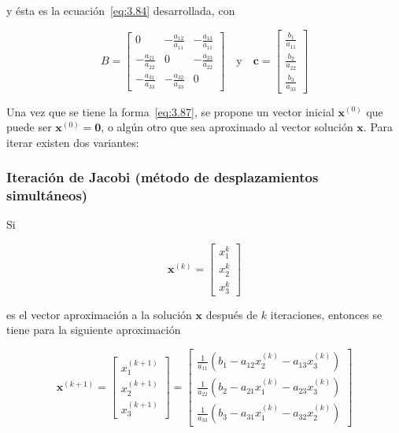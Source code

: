 \documentclass[12pt,letterpaper]{article}
\theoremstyle{definition}
\theoremstyle{plain}
\theoremstyle{remark}
\begin{document}
y ésta es la ecuación~\eqref{eq:3.84} desarrollada, con

\[
B = 
\begin{bmatrix}
0 & -\frac{a_{12}}{a_{11}} & -\frac{a_{13}}{a_{11}} \\
-\frac{a_{21}}{a_{22}} & 0 & -\frac{a_{23}}{a_{22}} \\
-\frac{a_{31}}{a_{33}} & -\frac{a_{32}}{a_{33}} & 0
\end{bmatrix}
\quad \text{y} \quad
\mathbf{c} = 
\begin{bmatrix}
\frac{b_1}{a_{11}} \\
\frac{b_2}{a_{22}} \\
\frac{b_3}{a_{33}}
\end{bmatrix}
\]

Una vez que se tiene la forma~\eqref{eq:3.87}, se propone un vector inicial $\mathbf{x}^{(0)}$ que puede ser $\mathbf{x}^{(0)} = \mathbf{0}$, o algún otro que sea aproximado al vector solución $\mathbf{x}$. Para iterar existen dos variantes:

\subsubsection{Iteración de Jacobi (método de desplazamientos simultáneos)}

Si

\begin{equation}
\mathbf{x}^{(k)} = 
\begin{bmatrix}
x_1^{k} \\
x_2^{k} \\
x_3^{k}
\end{bmatrix}
\label{eq:3.88}
\tag{8}
\end{equation}

es el vector aproximación a la solución $\mathbf{x}$ después de $k$ iteraciones, entonces se tiene para la siguiente aproximación

\begin{equation}
\mathbf{x}^{(k+1)} =
\begin{bmatrix}
x_1^{(k+1)} \\
x_2^{(k+1)} \\
x_3^{(k+1)}
\end{bmatrix}
=
\begin{bmatrix}
\frac{1}{a_{11}} (b_1 - a_{12} x_2^{(k)} - a_{13} x_3^{(k)}) \\
\frac{1}{a_{22}} (b_2 - a_{21} x_1^{(k)} - a_{23} x_3^{(k)}) \\
\frac{1}{a_{33}} (b_3 - a_{31} x_1^{(k)} - a_{32} x_2^{(k)})
\end{bmatrix}
\label{eq:3.89}
\tag{9}
\end{equation}
\end{document}
